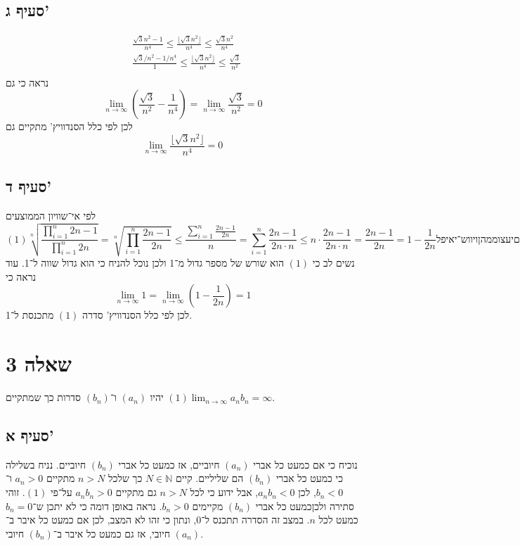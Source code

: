 \documentclass[a4paper]{article}
\def\NN{\mathbb{N}}
\begin{document}
\subsection{סעיף ג'}
\begin{align*}
	& \frac{\sqrt{3} n^2 - 1}{n^4} \le \frac{\lfloor \sqrt{3} n^2 \rfloor}{n^4} \le \frac{\sqrt{3} n^2}{n^4} \\
	& \frac{\sqrt{3}/n^2 - 1/n^4}{1} \le \frac{\lfloor \sqrt{3} n^2 \rfloor}{n^4} \le \frac{\sqrt{3}}{n^2} \\
\end{align*}
נראה כי גם
\[
	\lim_{n \to \infty} \left(\frac{\sqrt{3}}{n^2} - \frac{1}{n^4} \right)
	=
	\lim_{n \to \infty} \frac{\sqrt{3}}{n^2}
	= 0
\]
לכן לפי כלל הסנדוויץ' מתקיים גם
\[
	\lim_{n \to \infty} \frac{\lfloor \sqrt{3} n^2 \rfloor}{n^4} = 0
\]

\subsection{סעיף ד'}
לפי אי־שוויון הממוצעים
\[
	(1) \sqrt[n]{\frac{\displaystyle \prod_{i = 1}^{n} 2n - 1}{\displaystyle \prod_{i = 1}^{n} 2n }}
	= \sqrt[n]{\displaystyle \prod_{i = 1}^{n} \frac{2n - 1}{2n}}
	\le \frac{\displaystyle \sum_{i = 1}^{n} \frac{2n - 1}{2n}}{n}
	= \displaystyle \sum_{i = 1}^{n} \frac{2n - 1}{2n \cdot n}
	\le \displaystyle n \cdot \frac{2n - 1}{2n \cdot n}
	= \frac{2n - 1}{2n} 
	= 1 - \frac{1}{2n} 
לפי אי־שוויון הממוצעים
\]
נשים לב כי $(1)$ הוא שורש של מספר גדול מ־1 ולכן נוכל להניח כי הוא גדול שווה ל־1.
עוד נראה כי
\[
	\lim_{n \to \infty} 1 = \lim_{n \to \infty} \left( 1 - \frac{1}{2n} \right) = 1
\]
לכן לפי כלל הסנדוויץ' סדרה $(1)$ מתכנסת ל־1.

\section{שאלה 3}
יהיו $(a_n)$ ו־$(b_n)$ סדרות כך שמתקיים $(1) \lim_{n \to \infty} a_n b_n = \infty$.

\subsection{סעיף א'}
נוכיח כי אם כמעט כל אברי $(a_n)$ חיוביים, אז כמעט כל אברי $(b_n)$ חיוביים.
נניח בשלילה כי כמעט כל אברי $(b_n)$ הם שליליים. קיים $N \in \NN$
כך שלכל $n > N$ מתקיים $a_n > 0$ ו־$b_n < 0$, לכן $a_n b_n < 0$,
אבל ידוע כי לכל $n > N$ גם מתקיים $a_n b_n > 0$ על־פי $(1)$.
זוהי סתירה ולכןכמעט כל אברי $(b_n)$ מקיימים $b_n > 0$.
נראה באופן דומה כי לא יתכן ש־$b_n = 0$ כמעט לכל $n$.
במצב זה הסדרה תתכנס ל־$0$, ונתון כי זהו לא המצב,
לכן אם כמעט כל איבר ב־$(a_n)$ חיובי, אז גם כמעט כל איבר ב־$(b_n)$ חיובי.
\end{document}
